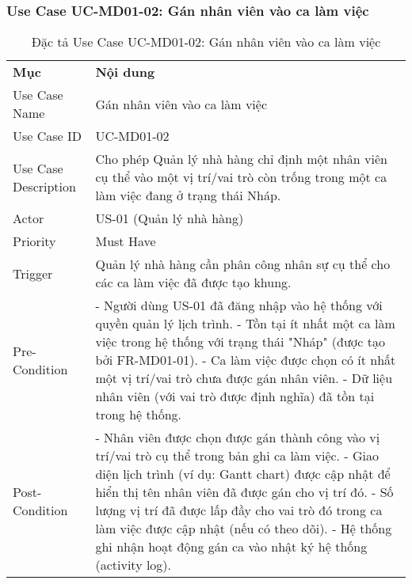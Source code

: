 \subsubsection{Use Case UC-MD01-02: Gán nhân viên vào ca làm việc}
\begin{longtable}{|m{4cm}|p{11cm}|}
\caption{Đặc tả Use Case UC-MD01-02: Gán nhân viên vào ca làm việc} \label{tab:uc_md01_02} \\

\hline
\endhead %

\hline
\endfoot %

\hline
\endlastfoot %
\hline
\multicolumn{2}{|c|}{\textbf{2.1. Tóm tắt (Summary)}} \\
\hline
\textbf{Mục} & \textbf{Nội dung} \\
Use Case Name & Gán nhân viên vào ca làm việc \\
\hline
Use Case ID & UC-MD01-02 \\
\hline
Use Case Description & Cho phép Quản lý nhà hàng chỉ định một nhân viên cụ thể vào một vị trí/vai trò còn trống trong một ca làm việc đang ở trạng thái Nháp. \\
\hline
Actor & US-01 (Quản lý nhà hàng) \\
\hline
Priority & Must Have \\
\hline
Trigger & Quản lý nhà hàng cần phân công nhân sự cụ thể cho các ca làm việc đã được tạo khung. \\
\hline
Pre-Condition & - Người dùng US-01 đã đăng nhập vào hệ thống với quyền quản lý lịch trình. \newline - Tồn tại ít nhất một ca làm việc trong hệ thống với trạng thái "Nháp" (được tạo bởi FR-MD01-01). \newline - Ca làm việc được chọn có ít nhất một vị trí/vai trò chưa được gán nhân viên. \newline - Dữ liệu nhân viên (với vai trò được định nghĩa) đã tồn tại trong hệ thống. \\
\hline
Post-Condition & - Nhân viên được chọn được gán thành công vào vị trí/vai trò cụ thể trong bản ghi ca làm việc. \newline - Giao diện lịch trình (ví dụ: Gantt chart) được cập nhật để hiển thị tên nhân viên đã được gán cho vị trí đó. \newline - Số lượng vị trí đã được lấp đầy cho vai trò đó trong ca làm việc được cập nhật (nếu có theo dõi). \newline - Hệ thống ghi nhận hoạt động gán ca vào nhật ký hệ thống (activity log). \\

\end{longtable}
